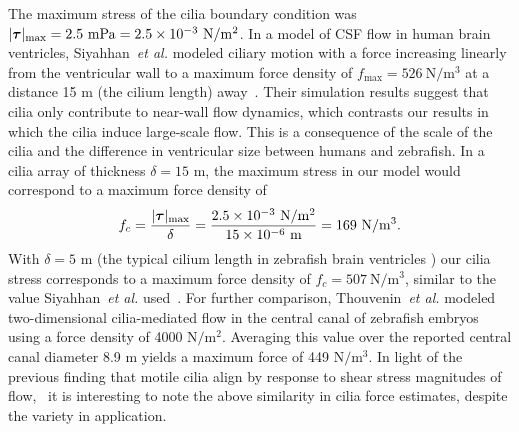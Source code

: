\documentclass{WileyMSP-template}
\begin{document}
The maximum stress of the cilia boundary condition was
$\vert\bm{\tau}\vert_{\mathrm{max}} = 2.5 \ \mathrm{mPa} = \num{2.5e-3} \ \mathrm{N/m^2}$.
In a model of CSF flow in human brain ventricles,
Siyahhan~\emph{et al.} modeled ciliary motion with
a force increasing linearly from
the ventricular wall to a maximum force density of
$f_{\mathrm{max}} = 526 \ \mathrm{N/m^3}$ at
a distance 15 \textmu m (the cilium length)
away~\cite{Siyahhan2014FlowVentricles}.
Their simulation results suggest that cilia only contribute to
near-wall flow dynamics, which contrasts our results in which
the cilia induce large-scale flow. This is a consequence of the 
scale of the cilia and the difference in ventricular size
between humans and zebrafish.
In a cilia array of thickness $\delta = 15$ \textmu m,
the maximum stress in our model would correspond to a maximum force density of 
\begin{equation*}
    f_c = \frac{\vert\bm{\tau}\vert_{\mathrm{max}}}{\delta}
        = \frac{\num{2.5e-3} \ \mathrm{N/m^2}}{\num{15e-6} \ \mathrm{m}}
        = 169 \ \mathrm{N/m^3}.
\end{equation*}
With $\delta=5$ \textmu m (the typical cilium length in zebrafish brain ventricles
\cite{Olstad2019CiliaryDevelopment,
Salman2022ComputationalEmbryo, Ringers2023NovelEpithelia}) 
our cilia stress corresponds to a maximum force density of
$f_c=507 \ \mathrm{N/m^3}$, similar to the value
Siyahhan~\emph{et al.} used~\cite{Siyahhan2014FlowVentricles}.
For further comparison, Thouvenin~\emph{et al.}
modeled two-dimensional cilia-mediated 
flow in the central canal of zebrafish
embryos using a force density of 4000 $\mathrm{N/m^2}$\cite{Thouvenin2020OriginCanal}.
Averaging this value over the reported central canal diameter 8.9 \textmu m
yields a maximum force of 449 $\mathrm{N/m^3}$.
In light of the previous finding that motile cilia
align by response to shear stress magnitudes
of flow,~\cite{Pellicciotta2020Cilia}
it is interesting to note the above similarity 
in cilia force estimates, despite the variety in application.
\end{document}

